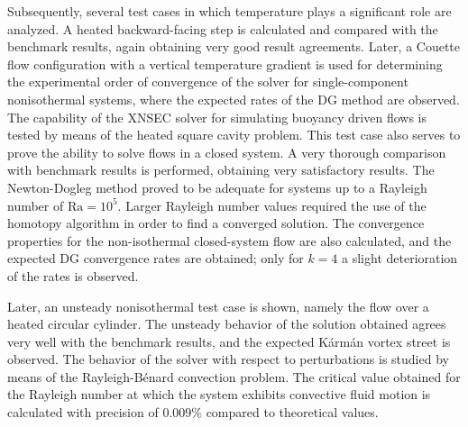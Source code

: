 Subsequently, several test cases in which temperature plays a significant role are analyzed. A heated backward-facing step is calculated and compared with the benchmark results, again obtaining very good result agreements. Later, a Couette flow configuration with a vertical temperature gradient is used for determining the experimental order of convergence of the solver for single-component nonisothermal systems, where the expected rates of the DG method are observed. The capability of the XNSEC solver for simulating buoyancy driven flows is tested by means of the heated square cavity problem. This test case also serves to prove the ability to solve flows in a closed system. A very thorough comparison with benchmark results is performed, obtaining very satisfactory results. The Newton-Dogleg method proved to be adequate for systems up to a Rayleigh number of $\text{Ra} = 10^5$. Larger Rayleigh number values required the use of the homotopy algorithm in order to find a converged solution. The convergence properties for the non-isothermal closed-system flow are also calculated, and the expected DG convergence rates are obtained; only for $k=4$ a slight deterioration of the rates is observed.

Later, an unsteady nonisothermal test case is shown, namely the flow over a heated circular cylinder. The unsteady behavior of the solution obtained agrees very well with the benchmark results, and the expected Kármán vortex street is observed. The behavior of the solver with respect to perturbations is studied by means of the Rayleigh-Bénard convection problem. The critical value obtained for the Rayleigh number at which the system exhibits convective fluid motion is calculated with precision of $0.009\%$ compared to theoretical values. 

